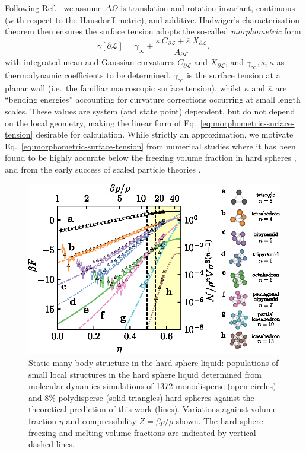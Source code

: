 \documentclass[11pt,twoside]{report}
\begin{document}
Following Ref.\ \cite{KonigPRL2004} we assume $\Delta\Omega$ is translation and rotation invariant, continuous (with respect to the Hausdorff metric), and additive.
Hadwiger's characterisation theorem \cite{Hadwiger1957} then ensures the surface tension adopts the so-called \emph{morphometric} form
\begin{equation}\label{eq:morphometric-surface-tension}
  \gamma[\partial\mathcal{L}] =
  \gamma_\infty +
  \frac{\kappa \, C_{\partial\mathcal{L}} + \overline{\kappa} \, X_{\partial\mathcal{L}}}
       {A_{\partial\mathcal{L}}},
\end{equation}
with integrated mean and Gaussian curvatures $C_{\partial\mathcal{L}}$ and $X_{\partial\mathcal{L}}$, and $\gamma_\infty,\kappa,\overline{\kappa}$ as thermodynamic coefficients to be determined.
$\gamma_\infty$ is the surface tension at a planar wall (i.e.\ the familiar macroscopic surface tension), whilst $\kappa$ and $\overline{\kappa}$ are ``bending energies'' accounting for curvature corrections occurring at small length scales.
These values are system (and state point) dependent, but do not depend on the local geometry, making the linear form of Eq.\ \eqref{eq:morphometric-surface-tension} desirable for calculation.
While strictly an approximation, we motivate Eq.\ \eqref{eq:morphometric-surface-tension} from numerical studies where it has been found to be highly accurate below the freezing volume fraction in hard spheres \cite{RothPRL2006,LairdPRE2012,BlokhuisPRE2013,UrrutiaPRE2014,Hansen-GoosJCP2014}, and from the early success of scaled particle theories \cite{ReissJCP1959,ReissJCP1960}.

\begin{figure}
  \includegraphics[width=\linewidth,center]{structure-populations}
  \caption{
    Static many-body structure in the hard sphere liquid: populations of small local structures in the hard sphere liquid determined from molecular dynamics simulations of 1372 monodisperse (open circles) and 8\% polydisperse (solid triangles) hard spheres against the theoretical prediction of this work (lines).
    Variations against volume fraction $\eta$ and compressibility $Z = \beta p/\rho$ shown.
    The hard sphere freezing and melting volume fractions are indicated by vertical dashed lines.
  }
  \label{fig:structure-populations}
\end{figure}
\end{document}
